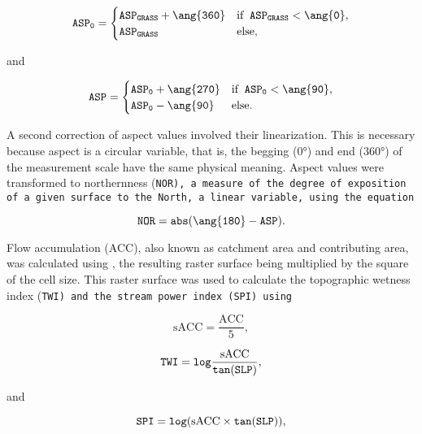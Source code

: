 \begin{equation}
 \tt{ASP}_{0} =
 \begin{cases}
  \tt{ASP}_{GRASS} + \ang{360} & \text{if}\;\; \tt{ASP}_{GRASS} < \ang{0}, \\
  \tt{ASP}_{GRASS}             & \text{else},
 \end{cases}
\end{equation}

\noindent and

\begin{equation}
 \tt{ASP} =
 \begin{cases}
  \tt{ASP}_{0} + \ang{270} & \text{if}\;\; \tt{ASP}_{0} < \ang{90}, \\
  \tt{ASP}_{0} - \ang{90}  & \text{else}.
 \end{cases}
\end{equation}

\noindent A second correction of aspect values involved their linearization. This is necessary because aspect 
is a circular variable, that is, the begging (\ang{0}) and end (\ang{360}) of the measurement scale have the 
same physical meaning. Aspect values were transformed to northernness (\tt{NOR}), a measure of the degree 
of exposition of a given surface to the North, a linear variable, using the equation

\begin{equation}
 \tt{NOR} = abs(\ang{180} - \tt{ASP}).
\end{equation}\label{eq:NOR}  

Flow accumulation (ACC), also known as catchment area and contributing area, was calculated using 
, the resulting raster surface being multiplied by the square of the cell size. This raster 
surface was used to calculate the topographic wetness index (\tt{TWI}) and the stream power index (\tt{SPI}) 
using

\begin{equation}
 \text{sACC} = \dfrac{\text{ACC}}{5},
\end{equation}\label{eq:sACC}

\begin{equation}
 \tt{TWI} = log \dfrac{\text{sACC}}{tan(\tt{SLP})},
\end{equation}\label{eq:TWI}

\noindent and

\begin{equation}
 \tt{SPI} = log(\text{sACC} \times tan(\tt{SLP})),
\end{equation}\label{eq:SPI}

